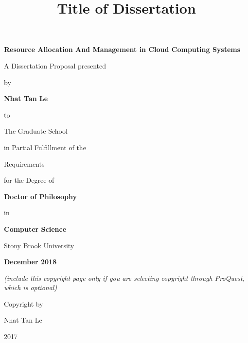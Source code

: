 \documentclass[12pt]{article}
\begin{document}
\title{\bf{Title of Dissertation}}

\vspace*{3\baselineskip}
\centerline{\bf{Resource Allocation And Management in Cloud Computing Systems}}
\vspace*{1\baselineskip}
\centerline{A Dissertation Proposal presented}
\vspace*{1\baselineskip}
\centerline{by} 
\vspace*{1\baselineskip}
\centerline{\bf{Nhat Tan Le}}
\vspace*{1\baselineskip}
\centerline{to} 
\vspace*{1\baselineskip}
\centerline{The Graduate School}
\vspace*{1\baselineskip}
\centerline{in Partial Fulfillment of the}
\vspace*{1\baselineskip}
\centerline{Requirements}
\vspace*{1\baselineskip}
\centerline{for the Degree of}
\vspace*{1\baselineskip}
\centerline{\bf{Doctor of Philosophy}}
\vspace*{1\baselineskip}
\centerline{in}
\vspace*{1\baselineskip}
\centerline{\bf{Computer Science}}
\vspace*{2\baselineskip}
\centerline{Stony Brook University}
\vspace*{2\baselineskip}
\centerline{\bf{December 2018}}     

\newpage
{}

\vspace*{32\baselineskip}
\centerline{\it{(include this copyright page only if you are selecting copyright through ProQuest, which is optional)}}
\vspace*{1\baselineskip}
\centerline{Copyright by}
\centerline{Nhat Tan Le}
\centerline{2017}

\newpage
{}
\setcounter{page}{2}
\end{document}

